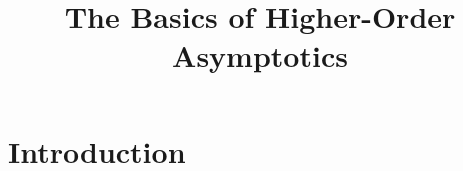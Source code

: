 \documentclass{article}
\title{ {\bf The Basics of Higher-Order Asymptotics} }
\begin{document}
	
\maketitle
\RaggedRight

\section{Introduction}



	
	
\end{document}
